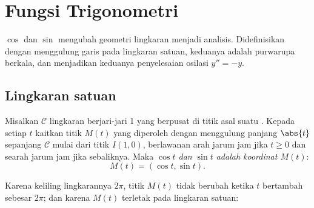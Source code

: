 \chapter{Fungsi Trigonometri}\label{ch:g12:trigo}

 $\cos$ dan $\sin$ mengubah geometri lingkaran menjadi
analisis. Didefinisikan dengan menggulung garis  pada lingkaran
satuan, keduanya adalah purwarupa  berkala, dan  menjadikan
keduanya penyelesaian  osilasi $y'' = -y$.

\section{Lingkaran satuan}

\begin{definition}\label{def:g12:trigo:cossin}
Misalkan $\mathcal{C}$ lingkaran berjari-jari 1 yang berpusat di titik asal
suatu  . Kepada setiap  $t$ kaitkan
titik $M(t)$ yang diperoleh dengan menggulung panjang $\abs{t}$ sepanjang
$\mathcal{C}$ mulai dari titik $I(1,0)$, berlawanan arah jarum jam jika
$t \geq 0$ dan searah jarum jam jika sebaliknya. Maka \emph{$\cos t$ dan
$\sin t$ adalah koordinat $M(t)$}:
\[
M(t) = (\cos t, \sin t).
\]
\end{definition}

\begin{omfigure}
\end{omfigure}

Karena keliling lingkarannya $2\pi$, titik $M(t)$ tidak berubah ketika
$t$ bertambah sebesar $2\pi$; dan karena $M(t)$ terletak pada lingkaran satuan:

